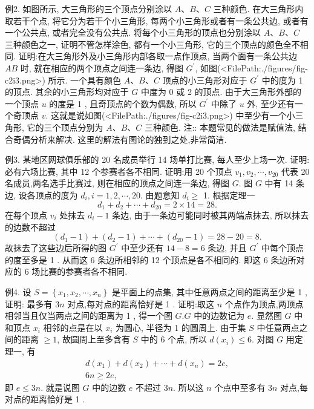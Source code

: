 例2. 如图所示, 大三角形的三个顶点分别涂以 $A 、 B 、 C$ 三种颜色.
在大三角形内取若干个点, 将它分为若干个小三角形, 每两个小三角形或者有一条公共边, 或者有一个公共点, 或者完全没有公共点.
将每个小三角形的顶点也分别涂以 $A 、 B 、 C$ 三种颜色之一, 证明不管怎样涂色, 都有一个小三角形, 它的三个顶点的颜色全不相同.
证明:在大三角形外及小三角形内部各取一点作顶点, 当两个面有一条公共边 $A B$ 时, 就在相应的两个顶点之间连一条边, 得图 $G^{\prime}$, 如图(<FilePath:./figures/fig-c2i3.png>) 所示.
一个具有颜色 $A 、 B 、 C$ 顶点的小三角形对应于 $G^{\prime}$ 中的度为 1 的顶点.
其余的小三角形均对应于 $G$ 中度为 0 或 2 的顶点.
由于大三角形外部的一个顶点 $u$ 的度是 1 , 且奇顶点的个数为偶数, 所以 $G^{\prime}$ 中除了 $u$ 外, 至少还有一个奇顶点 $v$. 这就是说如图(<FilePath:./figures/fig-c2i3.png>) 中至少有一个小三角形, 它的三个顶点分别为 $A 、 B 、 C$ 三种颜色.
注:: 本题常见的做法是赋值法, 结合奇偶分析来解决.
这里的解法有图论的独到之处,非常简洁.



例3. 某地区网球俱乐部的 20 名成员举行 14 场单打比赛, 每人至少上场一次.
证明: 必有六场比赛, 其中 12 个参赛者各不相同.
证明:用 20 个顶点 $v_1, v_2, \cdots, v_{20}$ 代表 20 名成员,两名选手比赛过, 则在相应的顶点之间连一条边, 得图 $G$.
图 $G$ 中有 14 条边, 设各顶点的度为 $d_i, i=1,2, \cdots, 20$. 由题意知 $d_i \geqslant$ 1. 根据定理一
$$
d_1+d_2+\cdots+d_{20}=2 \times 14=28 .
$$
在每个顶点 $v_i$ 处抹去 $d_i-1$ 条边, 由于一条边可能同时被其两端点抹去, 所以抹去的边数不超过
$$
\left(d_1-1\right)+\left(d_2-1\right)+\cdots+\left(d_{20}-1\right)=28-20=8 .
$$
故抹去了这些边后所得的图 $G^{\prime}$ 中至少还有 $14-8=6$ 条边, 并且 $G^{\prime}$ 中每个顶点的度至多是 1 . 从而这 6 条边所相邻的 12 个顶点是各不相同的.
即这 6 条边所对应的 6 场比赛的参赛者各不相同.



例4. 设 $S=\left\{x_1, x_2, \cdots, x_n\right\}$ 是平面上的点集, 其中任意两点之间的距离至少是 1 , 证明: 最多有 $3 n$ 对点,每对点的距离恰好是 1 .
证明:取这 $n$ 个点作为顶点,两顶点相邻当且仅当两点之间的距离为 1 , 得一个图 $G . G$ 中的边数记为 $e$.
显然图 $G$ 中和顶点 $x_i$ 相邻的点是在以 $x_i$ 为圆心, 半径为 1 的圆周上.
由于集 $S$ 中任意两点之间的距离 $\geqslant 1$, 故圆周上至多含有 $S$ 中的 6 个点, 所以 $d\left(x_i\right) \leqslant 6$.
对图 $G$ 用定理一, 有
$$
\begin{gathered}
d\left(x_1\right)+d\left(x_2\right)+\cdots+d\left(x_n\right)=2 e, \\
6 n \geqslant 2 e,
\end{gathered}
$$
即 $e \leqslant 3 n$. 就是说图 $G$ 中的边数 $e$ 不超过 $3 n$. 所以这 $n$ 个点中至多有 $3 n$ 对点,每对点的距离恰好是 1 .



